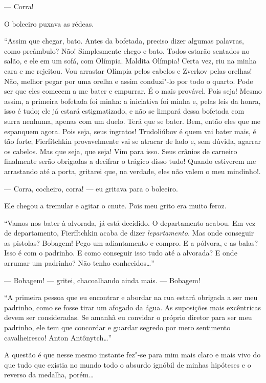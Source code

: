 --- Corra!

O boleeiro puxava as rédeas.

``Assim que chegar, bato. Antes da bofetada, preciso dizer algumas
palavras, como preâmbulo? Não! Simplesmente chego e bato. Todos estarão
sentados no salão, e ele em um sofá, com Olímpia. Maldita Olímpia! Certa
vez, riu na minha cara e me rejeitou. Vou arrastar Olímpia pelos cabelos
e Zverkov pelas orelhas! Não, melhor pegar por uma orelha e assim
conduzi"-lo por todo o quarto. Pode ser que eles comecem a me bater e
empurrar. É o mais provável. Pois seja! Mesmo assim, a primeira bofetada
foi minha: a iniciativa foi minha e, pelas leis da honra, isso é tudo;
ele já estará estigmatizado, e não se limpará dessa bofetada com surra
nenhuma, apenas com um duelo. Terá que se bater. Bem, então eles que me
espanquem agora. Pois seja, seus ingratos! Trudoliúbov é quem vai bater
mais, é tão forte; Fierfítchkin provavelmente vai se atracar de lado e,
sem dúvida, agarrar os cabelos. Mas que seja, que seja! Vim para isso.
Seus crânios de carneiro finalmente serão obrigadas a decifrar o trágico
disso tudo! Quando estiverem me arrastando até a porta, gritarei que, na
verdade, eles não valem o meu mindinho!.

--- Corra, cocheiro, corra! --- eu gritava para o boleeiro.

Ele chegou a tremular e agitar o cnute. Pois meu grito era muito feroz.

``Vamos nos bater à alvorada, já está decidido. O departamento acabou.
Em vez de departamento, Fierfítchkin acaba de dizer \emph{lepartamento.}
Mas onde conseguir as pistolas? Bobagem! Pego um adiantamento e compro.
E a pólvora, e as balas? Isso é com o padrinho. E como conseguir isso
tudo até a alvorada? E onde arrumar um padrinho? Não tenho
conhecidos\ldots{}''

--- Bobagem! --- gritei, chacoalhando ainda mais. --- Bobagem!

``A primeira pessoa que eu encontrar e abordar na rua estará obrigada a
ser meu padrinho, como se fosse tirar um afogado da água. As suposições
mais excêntricas devem ser consideradas. Se amanhã eu convidar o próprio
diretor para ser meu padrinho, ele tem que concordar e guardar segredo
por mero sentimento cavalheiresco! Anton Antônytch\ldots{}''

A questão é que nesse mesmo instante fez"-se para mim mais claro e mais
vivo do que tudo que existia no mundo todo o absurdo ignóbil de minhas
hipóteses e o reverso da medalha, porém\ldots{}

